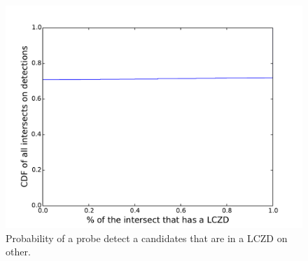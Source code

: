 

\begin{figure}
\begin{center}
\includegraphics[width=0.8\columnwidth]{figs/patching/overlapcoverage.pdf}
\caption{Probability of a probe detect a candidates that are in a LCZD on other.}
\label{fig:lczd.intersection}
\end{center}
%
\end{figure}
